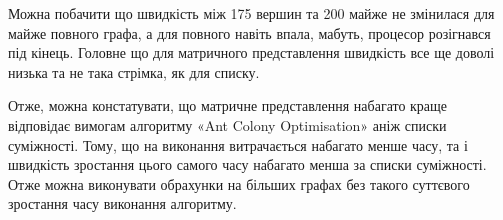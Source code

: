 \documentclass[12pt, letterpaper]{article}
\begin{document}
Можна побачити що швидкість між 175 вершин та 200 майже не змінилася для майже повного графа, а для повного навіть впала, мабуть, процесор розігнався під кінець.
Головне що для матричного представлення швидкість все ще доволі низька та не така стрімка, як для списку.

Отже, можна констатувати, що матричне представлення набагато краще відповідає вимогам алгоритму «Ant Colony Optimisation» аніж списки суміжності. 
Тому, що на виконання витрачається набагато менше часу, та і швидкість зростання цього самого часу набагато менша за списки суміжності. 
Отже можна виконувати обрахунки на більших графах без такого суттєвого зростання часу виконання алгоритму.
\end{document}
